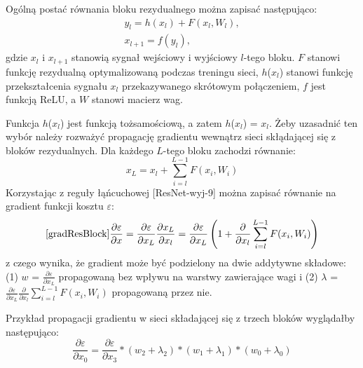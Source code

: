 Ogólną postać równania bloku rezydualnego można zapisać następująco:
\begin{equation}
\begin{split}
y_l = h(x_l) + F(x_l, W_l),\\
x_{l+1} = f(y_l),
\end{split}
\end{equation}
gdzie $x_l$ i $x_{l+1}$ stanowią sygnał wejściowy i wyjściowy $l$-tego bloku. $F$ stanowi funkcję rezydualną optymalizowaną podczas treningu sieci, $h$($x_l$) stanowi funkcję przekształcenia sygnału $x_l$ przekazywanego skrótowym połączeniem, $f$ jest funkcją ReLU, a $W$ stanowi macierz wag.

Funkcja $h$($x_l$) jest funkcją tożsamościową, a zatem $h$($x_l$) = $x_l$. Żeby uzasadnić ten wybór należy rozważyć propagację gradientu wewnątrz sieci skłądającej się z bloków rezydualnych. Dla każdego $L$-tego bloku zachodzi równanie:
\begin{equation}
x_L = x_l + \sum_{i=l}^{L-1}F(x_i, W_i)
\end{equation}
Korzystając z reguły łąńcuchowej [ResNet-wyj-9] można zapisać równanie na gradient funkcji kosztu $\varepsilon$:
\begin{equation}
\ref{gradResBlock}
\frac{\partial \varepsilon}{\partial x} =  \frac{\partial \varepsilon}{\partial x_L} \frac{\partial x_L}{\partial x_l} =  \frac{\partial \varepsilon}{\partial x_L}\left (1 +   \frac{\partial }{\partial x_l}\sum_{i=l}^{L-1}F(x_i, W_i) \right )
\end{equation}
z czego wynika, że gradient może być podzielony na dwie addytywne składowe: (1) $w$ = $\frac{\partial \varepsilon}{\partial x_L}$ propagowaną bez wpływu na warstwy zawierające wagi i (2) $\lambda$ = $\frac{\partial \varepsilon}{\partial x_L}\frac{\partial }{\partial x_l}\sum_{i=l}^{L-1}F(x_i, W_i)$ propagowaną przez nie.

Przykład propagacji gradientu w sieci składającej się z trzech bloków wyglądałby następująco:
\begin{equation}
\frac{\partial \varepsilon}{\partial x_0} =  \frac{\partial \varepsilon}{\partial x_3}*(w_2+\lambda_2)*(w_1+\lambda_1)*(w_0+\lambda_0)
\end{equation}

